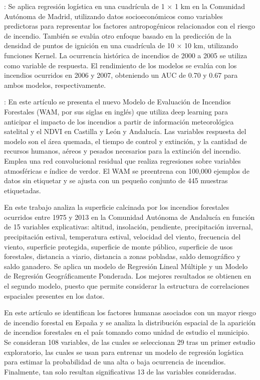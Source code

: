 \documentclass[12pt,a4paper,]{book}
\numberwithin{dummy}{section}
\theoremstyle{ocrenumbox}
\theoremstyle{blacknumex}
\theoremstyle{blacknumbox}
\theoremstyle{ocrenum}
\theoremstyle{ocrenum}
\begin{document}
\citet{logreg_hcwf}: Se aplica regresión logística en una cuadrícula de
1 × 1 km en la Comunidad Autónoma de Madrid, utilizando datos
socioeconómicos como variables predictoras para representar los factores
antropogénicos relacionados con el riesgo de incendio. También se evalúa
otro enfoque basado en la predicción de la densidad de puntos de
ignición en una cuadrícula de 10 × 10 km, utilizando funciones Kernel.
La ocurrencia histórica de incendios de 2000 a 2005 se utiliza como
variable de respuesta. El rendimiento de los modelos se evalúa con los
incendios ocurridos en 2006 y 2007, obteniendo un AUC de 0.70 y 0.67
para ambos modelos, respectivamente.

\citet{SpainOnFire}: En este artículo se presenta el nuevo Modelo de
Evaluación de Incendios Forestales (WAM, por sus siglas en inglés) que
utiliza deep learning para anticipar el impacto de los incendios a
partir de información meteorológica satelital y el NDVI en Castilla y
León y Andalucía. Las variables respuesta del modelo son el área
quemada, el tiempo de control y extinción, y la cantidad de recursos
humanos, aéreos y pesados necesarios para la extinción del incendio.
Emplea una red convolucional residual que realiza regresiones sobre
variables atmosféricas e índice de verdor. El WAM se preentrena con
100,000 ejemplos de datos sin etiquetar y se ajusta con un pequeño
conjunto de 445 muestras etiquetadas.

\citet{incendiosAndalucia} En este trabajo analiza la superficie
calcinada por los incendios forestales ocurridos entre 1975 y 2013 en la
Comunidad Autónoma de Andalucía en función de 15 variables explicativas:
altitud, insolación, pendiente, precipitación invernal, precipitación
estival, temperatura estival, velocidad del viento, frecuencia del
viento, superficie protegida, superficie de monte público, superficie de
usos forestales, distancia a viario, distancia a zonas pobladas, saldo
demográfico y saldo ganadero. Se aplica un modelo de Regresión Lineal
Múltiple y un Modelo de Regresión Geográficamente Ponderada. Los mejores
resultados se obtienen en el segundo modelo, puesto que permite
considerar la estructura de correlaciones espaciales presentes en los
datos.

\citet{HumanCauseWildFiresSpain} En este artículo se identifican los
factores humanas asociados con un mayor riesgo de incendio forestal en
España y se analiza la distribución espacial de la aparición de
incendios forestales en el país tomando como unidad de estudio el
municipio. Se consideran 108 variables, de las cuales se seleccionan 29
tras un primer estudio exploratorio, las cuales se usan para entrenar un
modelo de regresión logística para estimar la probabilidad de una alta o
baja ocurrencia de incendios. Finalmente, tan solo resultan
significativas 13 de las variables consideradas.

\citet{stojanova2012estimating} \citet{SAYAD2019130}




%
\end{document}
